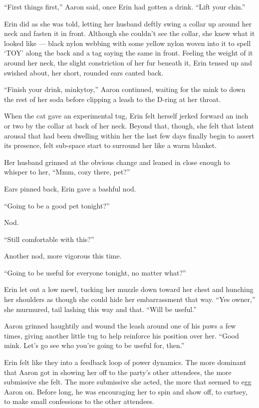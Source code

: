 ``First things first,'' Aaron said, once Erin had gotten a drink. ``Lift
your chin.''

Erin did as she was told, letting her husband deftly swing a collar up
around her neck and fasten it in front. Although she couldn't see the
collar, she knew what it looked like --- black nylon webbing with some
yellow nylon woven into it to spell `TOY' along the back and a tag
saying the same in front. Feeling the weight of it around her neck, the
slight constriction of her fur beneath it, Erin tensed up and swished
about, her short, rounded ears canted back.

``Finish your drink, minkytoy,'' Aaron continued, waiting for the mink
to down the rest of her soda before clipping a leash to the D-ring at
her throat.

When the cat gave an experimental tug, Erin felt herself jerked forward
an inch or two by the collar at back of her neck. Beyond that, though,
she felt that latent arousal that had been dwelling within her the last
few days finally begin to assert its presence, felt sub-space start to
surround her like a warm blanket.

Her husband grinned at the obvious change and leaned in close enough to
whisper to her, ``Mmm, cozy there, pet?''

Ears pinned back, Erin gave a bashful nod.

``Going to be a good pet tonight?''

Nod.

``Still comfortable with this?''

Another nod, more vigorous this time.

``Going to be useful for everyone tonight, no matter what?''

Erin let out a low mewl, tucking her muzzle down toward her chest and
hunching her shoulders as though she could hide her embarrassment that
way. ``Yes owner,'' she murmured, tail lashing this way and that. ``Will
be useful.''

Aaron grinned haughtily and wound the leash around one of his paws a few
times, giving another little tug to help reinforce his position over
her. ``Good mink. Let's go see who you're going to be useful for,
then.''

Erin felt like they into a feedback loop of power dynamics. The more
dominant that Aaron got in showing her off to the party's other
attendees, the more submissive she felt. The more submissive she acted,
the more that seemed to egg Aaron on. Before long, he was encouraging
her to spin and show off, to curtsey, to make small confessions to the
other attendees.

